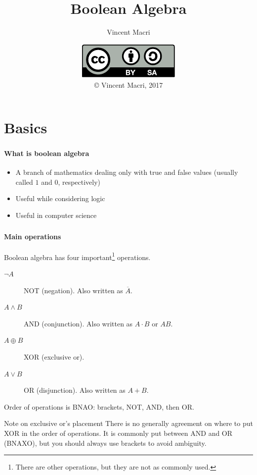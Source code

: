 \documentclass[mathserif]{beamer}
\title{Boolean Algebra}
\author{Vincent Macri}
\date{\includegraphics{../LicenseLogo}\\\copyright{} Vincent Macri, 2017}
\newenvironment{namedframe}[1]%
	{\begin{frame}\frametitle{\secname}\framesubtitle{#1}}
	{\end{frame}}
\newcommand{\xor}{\oplus}
\newcommand{\negate}[1]{\overline{#1}}
\begin{document}
	\frame{\titlepage}
	\section{Basics}
	\begin{namedframe}{What is boolean algebra}
		\begin{itemize}[<+->]
			\item A branch of mathematics dealing only with true and false values (usually called $1$ and $0$, respectively)
			\item Useful while considering logic
			\item Useful in computer science
		\end{itemize}
	\end{namedframe}
	\begin{namedframe}{Main operations}
		Boolean algebra has four important\footnote{There are other operations, but they are not as commonly used.} operations.
		\pause
		\begin{description}
			\item[$\neg A$] NOT (negation). Also written as $\negate{A}$.
			\item[$A \wedge B$] AND (conjunction). Also written as $A \cdot B$ or $AB$.
			\item[$A \xor B$] XOR (exclusive or).
			\item[$A \vee B$] OR (disjunction). Also written as $A + B$.
		\end{description}
		\pause
		Order of operations is \alert{BNAO}: brackets, NOT, AND, then OR.
		\pause
		\begin{alertblock}{Note on exclusive or's placement}
			\vspace{-0.5\baselineskip}
			There is no generally agreement on where to put XOR in the order of operations. It is commonly put between AND and OR (BNAXO), but you should always use brackets to avoid ambiguity.
		\end{alertblock}
	\end{namedframe}
\end{document}
